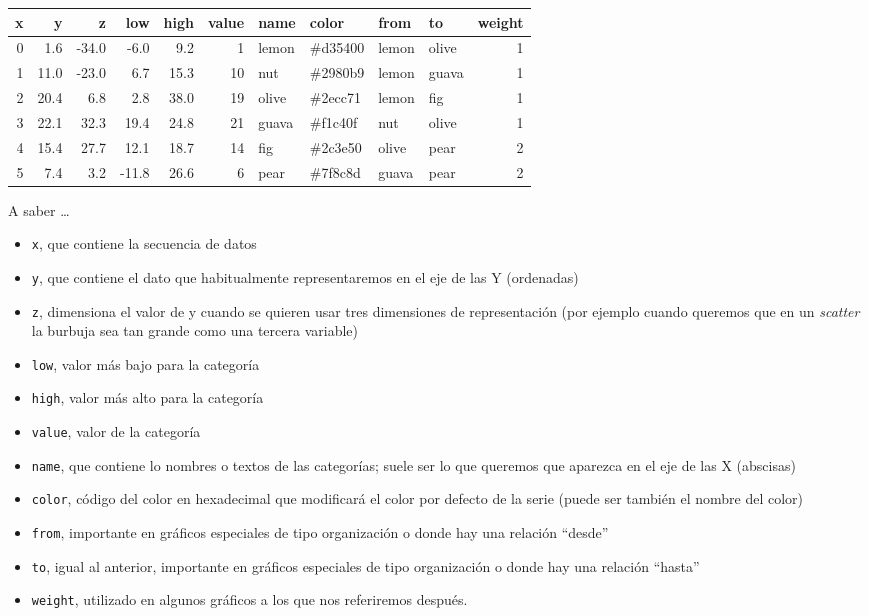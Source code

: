 \documentclass[
]{book}
\providecommand{\tightlist}{%
  \setlength{\itemsep}{0pt}\setlength{\parskip}{0pt}}
\begin{document}
\begin{tabular}{r|r|r|r|r|r|l|l|l|l|r}
\hline
x & y & z & low & high & value & name & color & from & to & weight\\
\hline
0 & 1.6 & -34.0 & -6.0 & 9.2 & 1 & lemon & \#d35400 & lemon & olive & 1\\
\hline
1 & 11.0 & -23.0 & 6.7 & 15.3 & 10 & nut & \#2980b9 & lemon & guava & 1\\
\hline
2 & 20.4 & 6.8 & 2.8 & 38.0 & 19 & olive & \#2ecc71 & lemon & fig & 1\\
\hline
3 & 22.1 & 32.3 & 19.4 & 24.8 & 21 & guava & \#f1c40f & nut & olive & 1\\
\hline
4 & 15.4 & 27.7 & 12.1 & 18.7 & 14 & fig & \#2c3e50 & olive & pear & 2\\
\hline
5 & 7.4 & 3.2 & -11.8 & 26.6 & 6 & pear & \#7f8c8d & guava & pear & 2\\
\hline
\end{tabular}

A saber \ldots{}

\begin{itemize}
\tightlist
\item
  \texttt{x}, que contiene la secuencia de datos
\item
  \texttt{y}, que contiene el dato que habitualmente representaremos en el eje de las Y (ordenadas)
\item
  \texttt{z}, dimensiona el valor de y cuando se quieren usar tres dimensiones de representación (por ejemplo cuando queremos que en un \emph{scatter} la burbuja sea tan grande como una tercera variable)
\item
  \texttt{low}, valor más bajo para la categoría
\item
  \texttt{high}, valor más alto para la categoría
\item
  \texttt{value}, valor de la categoría
\item
  \texttt{name}, que contiene lo nombres o textos de las categorías; suele ser lo que queremos que aparezca en el eje de las X (abscisas)
\item
  \texttt{color}, código del color en hexadecimal que modificará el color por defecto de la serie (puede ser también el nombre del color)
\item
  \texttt{from}, importante en gráficos especiales de tipo organización o donde hay una relación ``desde''
\item
  \texttt{to}, igual al anterior, importante en gráficos especiales de tipo organización o donde hay una relación ``hasta''
\item
  \texttt{weight}, utilizado en algunos gráficos a los que nos referiremos después.
\end{itemize}
\end{document}
